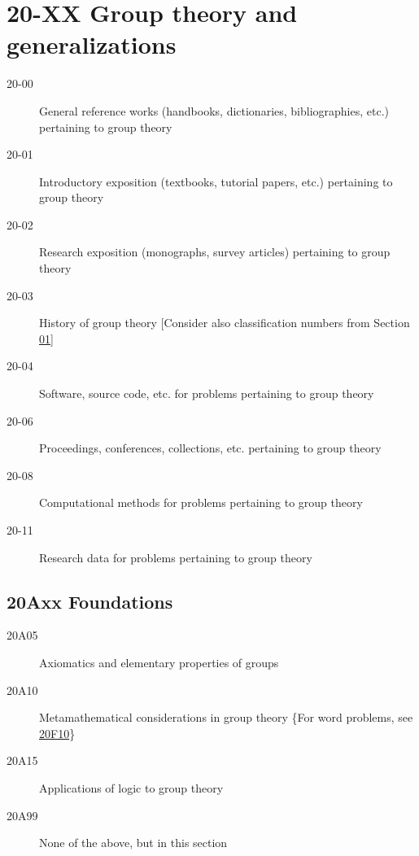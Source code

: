 \section*{20-XX Group theory and generalizations }\label{20-XX}
\begin{description}
\item [20-00]\label{20-00} General reference works (handbooks, dictionaries, bibliographies, etc.) pertaining to group theory
\item [20-01]\label{20-01} Introductory exposition (textbooks, tutorial papers, etc.) pertaining to group theory
\item [20-02]\label{20-02} Research exposition (monographs, survey articles) pertaining to group theory
\item [20-03]\label{20-03} History of group theory [Consider also classification numbers from Section \hyperref[01-XX]{01}]
\item [20-04]\label{20-04} Software, source code, etc. for problems pertaining to group theory
\item [20-06]\label{20-06} Proceedings, conferences, collections, etc. pertaining to group theory
\item [20-08]\label{20-08} Computational methods for problems pertaining to group theory
\item [20-11]\label{20-11} Research data for problems pertaining to group theory  
\end{description}
\subsection*{20Axx  Foundations }\label{20Axx}
\begin{description}  
\item [20A05]\label{20A05} Axiomatics and elementary properties of groups
\item [20A10]\label{20A10} Metamathematical considerations in group theory \{For word problems, see \hyperref[20F10]{20F10}\}
\item [20A15]\label{20A15} Applications of logic to group theory
\item [20A99]\label{20A99} None of the above, but in this section
\end{description}
